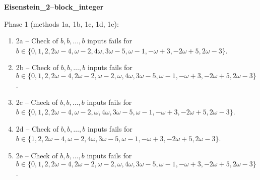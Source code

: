 \begin{exmp}
\label{ex:compareAD}

\textbf{Eisenstein\_2--block\_integer}

Phase 1 (methods 1a, 1b, 1c, 1d, 1e):
\begin{enumerate}[ ]
\item  2a -- Check of $b,b,\dots,b$ inputs fails for $b\in \{0, 1, 2, 2\omega - 4, \omega - 2, 4\omega, 3\omega - 5, \omega - 1, -\omega + 3, -2\omega + 5, 2\omega - 3\}$.
\item  2b -- Check of $b,b,\dots,b$ inputs fails for $b\in \{0, 1, 2, 2\omega - 4, 2\omega - 2, \omega - 2, \omega, 4\omega, 3\omega - 5, \omega - 1, -\omega + 3, -2\omega + 5, 2\omega - 3\}$.
\item  2c -- Check of $b,b,\dots,b$ inputs fails for $b\in \{0, 1, 2, 2\omega - 4, \omega - 2, \omega, 4\omega, 3\omega - 5, \omega - 1, -\omega + 3, -2\omega + 5, 2\omega - 3\}$.
\item  2d -- Check of $b,b,\dots,b$ inputs fails for $b\in \{1, 2, 2\omega - 4, \omega - 2, 4\omega, 3\omega - 5, \omega - 1, -\omega + 3, -2\omega + 5, 2\omega - 3\}$.
\item  2e -- Check of $b,b,\dots,b$ inputs fails for $b\in \{0, 1, 2, 2\omega - 4, 2\omega - 2, \omega - 2, \omega, 4\omega, 3\omega - 5, \omega - 1, -\omega + 3, -2\omega + 5, 2\omega - 3\}$.
\end{enumerate}


\end{exmp}




